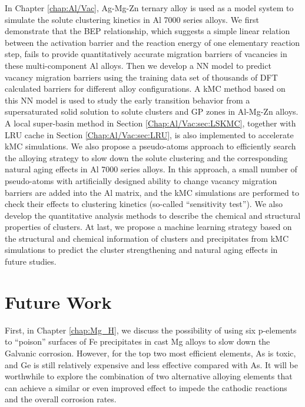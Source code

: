 In Chapter \ref{chap:Al/Vac}, Ag-Mg-Zn ternary alloy is used as a model system to simulate the solute clustering kinetics in Al 7000 series alloys. We first demonstrate that the \acf{BEP} relationship, which suggests a simple linear relation between the activation barrier and the reaction energy of one elementary reaction step, fails to provide quantitatively accurate migration barriers of vacancies in these multi-component Al alloys. Then we develop a \ac{NN} model to predict vacancy migration barriers using the training data set of thousands of \ac{DFT} calculated barriers for different alloy configurations. A \ac{kMC} method based on this \ac{NN} model is used to study the early transition behavior from a supersaturated solid solution to solute clusters and \acf{GP} zones in Al-Mg-Zn alloys. A local super-basin method  in Section \ref{Chap:Al/Vac:sec:LSKMC}, together with \ac{LRU} cache in Section \ref{Chap:Al/Vac:sec:LRU}, is also implemented to accelerate \ac{kMC} simulations. We also propose a pseudo-atoms approach to efficiently search the alloying strategy to slow down the solute clustering and the corresponding natural aging effects in Al 7000 series alloys. In this approach, a small number of pseudo-atoms with artificially designed ability to change vacancy migration barriers are added into the Al matrix, and the \ac{kMC} simulations are performed to check their effects to clustering kinetics (so-called ``sensitivity test''). We also develop the quantitative analysis methods to describe the chemical and structural properties of clusters. At last, we propose a machine learning strategy based on the structural and chemical information of clusters and precipitates from \ac{kMC} simulations to predict the cluster strengthening and natural aging effects in future studies.

\section{Future Work}

First, in Chapter \ref{chap:Mg_H}, we discuss the possibility of using six p-elements to ``poison'' surfaces of Fe precipitates in cast Mg alloys to slow down the Galvanic corrosion. However, for the top two most efficient elements, As is toxic, and Ge is still relatively expensive and less effective compared with As. It will be worthwhile to explore the combination of two alternative alloying elements that can achieve a similar or even improved effect to impede the cathodic reactions and the overall corrosion rates.

